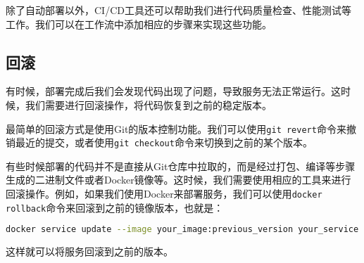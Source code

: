 除了自动部署以外，CI/CD工具还可以帮助我们进行代码质量检查、性能测试等工作。我们可以在工作流中添加相应的步骤来实现这些功能。

\subsection{回滚}

有时候，部署完成后我们会发现代码出现了问题，导致服务无法正常运行。这时候，我们需要进行回滚操作，将代码恢复到之前的稳定版本。

最简单的回滚方式是使用Git的版本控制功能。我们可以使用\texttt{git revert}命令来撤销最近的提交，或者使用\texttt{git checkout}命令来切换到之前的某个版本。

有些时候部署的代码并不是直接从Git仓库中拉取的，而是经过打包、编译等步骤生成的二进制文件或者Docker镜像等。这时候，我们需要使用相应的工具来进行回滚操作。例如，如果我们使用Docker来部署服务，我们可以使用\texttt{docker rollback}命令来回滚到之前的镜像版本，也就是：
\begin{lstlisting}[language=bash]
    docker service update --image your_image:previous_version your_service
\end{lstlisting}
这样就可以将服务回滚到之前的版本。
